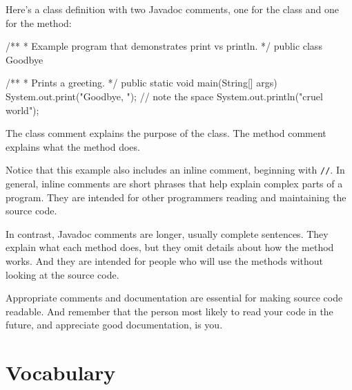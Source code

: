 \documentclass[12pt]{book}
\theoremstyle{exercise}
\newcommand{\java}[1]{\verb"#1"}
\begin{document}
Here's a class definition with two Javadoc comments, one for the class and one for the method:

\begin{code}
/**
 * Example program that demonstrates print vs println.
 */
public class Goodbye {

    /**
     * Prints a greeting.
     */
    public static void main(String[] args) {
        System.out.print("Goodbye, ");  // note the space
        System.out.println("cruel world");
    }
}
\end{code}

The class comment explains the purpose of the class.
The method comment explains what the method does.

Notice that this example also includes an inline comment, beginning with \java{//}.
In general, inline comments are short phrases that help explain complex parts of a program.
They are intended for other programmers reading and maintaining the source code.

In contrast, Javadoc comments are longer, usually complete sentences.
They explain what each method does, but they omit details about how the method works.
And they are intended for people who will use the methods without looking at the source code.

Appropriate comments and documentation are essential for making source code readable.
And remember that the person most likely to read your code in the future, and appreciate good documentation, is you.



\section{Vocabulary}
\end{document}
